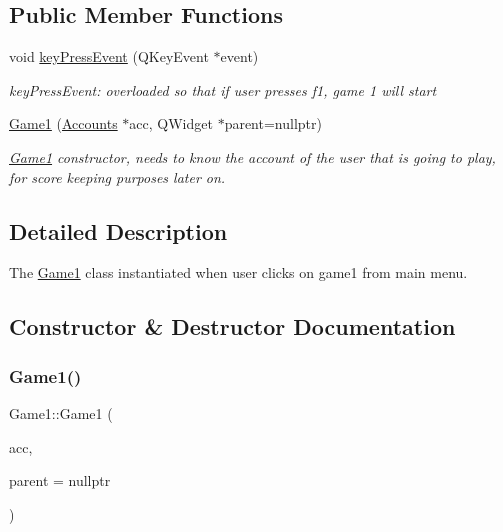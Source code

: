\subsection*{Public Member Functions}
\begin{DoxyCompactItemize}
\item 
void \hyperlink{classGame1_a1c1667a4c41a139217da796ca0f47fa6}{key\+Press\+Event} (Q\+Key\+Event $\ast$event)
\begin{DoxyCompactList}\small\item\em key\+Press\+Event\+: overloaded so that if user presses f1, game 1 will start \end{DoxyCompactList}\item 
\hyperlink{classGame1_a410b8810ee98414bbf08eb855a356e7d}{Game1} (\hyperlink{classAccounts}{Accounts} $\ast$acc, Q\+Widget $\ast$parent=nullptr)
\begin{DoxyCompactList}\small\item\em \hyperlink{classGame1}{Game1} constructor, needs to know the account of the user that is going to play, for score keeping purposes later on. \end{DoxyCompactList}\end{DoxyCompactItemize}


\subsection{Detailed Description}
The \hyperlink{classGame1}{Game1} class instantiated when user clicks on game1 from main menu. 

\subsection{Constructor \& Destructor Documentation}
\mbox{\label{classGame1_a410b8810ee98414bbf08eb855a356e7d}} 
\subsubsection{\texorpdfstring{Game1()}{Game1()}}
{\footnotesize\ttfamily Game1\+::\+Game1 (\begin{DoxyParamCaption}\item[{\hyperlink{classAccounts}{Accounts} $\ast$}]{acc,  }\item[{Q\+Widget $\ast$}]{parent = {\ttfamily nullptr} }\end{DoxyParamCaption})\hspace{0.3cm}{\ttfamily [explicit]}}



